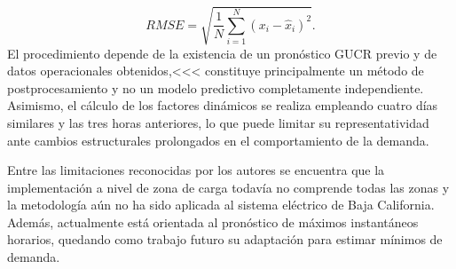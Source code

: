 \begin{equation}
RMSE =
\sqrt{
\frac{1}{N}
\sum_{i=1}^{N}
(x_i-\hat{x}_i)^2
}.
\end{equation}
El procedimiento depende de la existencia de un
pronóstico GUCR previo y de datos operacionales obtenidos,<<< constituye principalmente un método de
postprocesamiento y no un modelo predictivo completamente
independiente. Asimismo, el cálculo de los factores dinámicos se
realiza empleando cuatro días similares y las tres horas anteriores,
lo que puede limitar su representatividad ante cambios estructurales
prolongados en el comportamiento de la demanda.

Entre las limitaciones reconocidas por los autores se encuentra que
la implementación a nivel de zona de carga todavía no comprende todas las zonas y  la metodología aún no ha sido aplicada al
sistema eléctrico de Baja California. Además, actualmente está
orientada al pronóstico de máximos instantáneos horarios, quedando
como trabajo futuro su adaptación para estimar mínimos de demanda.
\cite{CondeLopez2026}